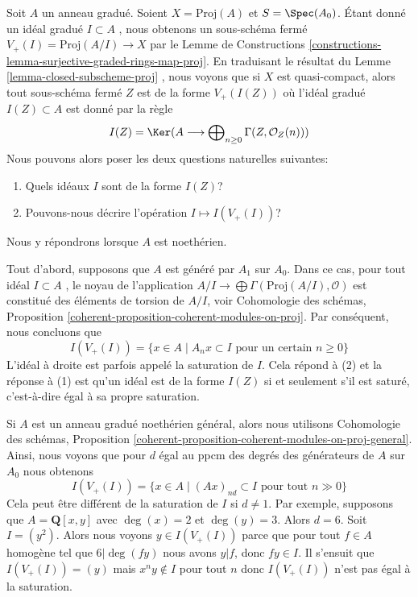 \begin{example}
\label{example-closed-subscheme-of-proj}
Soit  $A$  un anneau gradué. Soient  $X = \text{Proj}(A)$  et  $S = \Spec(A_0)$. Étant
donné un idéal gradué  $I \subset A$ , nous obtenons un sous-schéma fermé
 $V_+(I) = \text{Proj}(A/I) \to X$  par le Lemme de Constructions  \ref{constructions-lemma-surjective-graded-rings-map-proj}. En traduisant le résultat
du Lemme  \ref{lemma-closed-subscheme-proj} , nous voyons que si  $X$  est quasi-compact, alors
tout sous-schéma fermé  $Z$  est de la forme  $V_+(I(Z))$  où l'idéal gradué
 $I(Z) \subset A$  est donné par la règle
$$
I(Z) = \Ker(A \longrightarrow
\bigoplus\nolimits_{n \geq 0} \Gamma(Z, \mathcal{O}_Z(n)))
$$
Nous pouvons alors poser les deux questions naturelles suivantes:
\begin{enumerate}
\item Quels idéaux  $I$  sont de la forme  $I(Z)$?
\item Pouvons-nous décrire l'opération  $I \mapsto I(V_+(I))$?
\end{enumerate}
Nous y répondrons lorsque  $A$  est noethérien.

\medskip\noindent
Tout d'abord, supposons que  $A$  est généré par  $A_1$  sur
 $A_0$. Dans ce cas, pour tout idéal  $I \subset A$ , le noyau de l'application
 $A/I \to \bigoplus \Gamma(\text{Proj}(A/I), \mathcal{O})$  est constitué des éléments de torsion de  $A/I$, voir
Cohomologie des schémas, Proposition  \ref{coherent-proposition-coherent-modules-on-proj}. Par conséquent, nous concluons
que
$$
I(V_+(I)) = \{x \in A \mid A_n x \subset I\text{ pour un certain }n \geq 0\}
$$
L'idéal à droite est parfois appelé la saturation de  $I$. Cela répond à
(2) et la réponse à (1) est qu'un idéal est de la forme  $I(Z)$  si et
seulement s'il est saturé, c'est-à-dire égal à sa propre saturation.

\medskip\noindent
Si  $A$  est un anneau gradué noethérien général, alors nous utilisons
Cohomologie des schémas, Proposition  \ref{coherent-proposition-coherent-modules-on-proj-general}. Ainsi, nous voyons que pour
 $d$  égal au ppcm des degrés des générateurs de  $A$  sur
 $A_0$  nous obtenons
$$
I(V_+(I)) = \{x \in A \mid (Ax)_{nd} \subset I\text{ pour tout }n \gg 0\}
$$
Cela peut être différent de la saturation de  $I$  si  $d \not = 1$. Par
exemple, supposons que  $A = \mathbf{Q}[x, y]$  avec  $\deg(x) = 2$  et  $\deg(y) = 3$. Alors
 $d = 6$. Soit  $I = (y^2)$. Alors nous voyons  $y \in I(V_+(I))$  parce que pour
tout  $f \in A$  homogène tel que  $6 | \deg(fy)$  nous avons  $y | f$, donc
 $fy \in I$. Il s'ensuit que  $I(V_+(I)) = (y)$  mais  $x^n y \not \in I$  pour tout
 $n$  donc  $I(V_+(I))$  n'est pas égal à la saturation.
\end{example}

